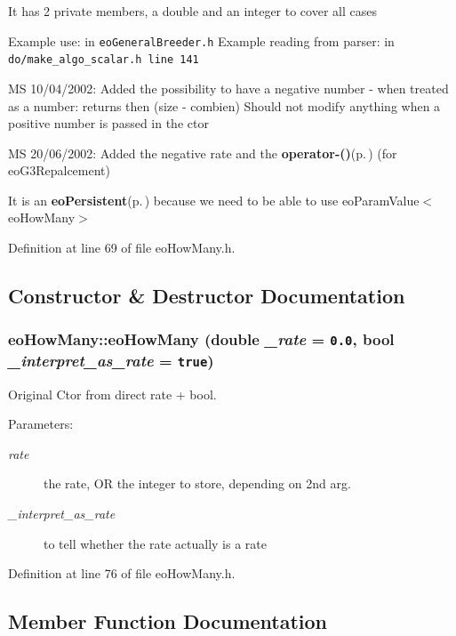 It has 2 private members, a double and an integer to cover all cases

Example use: in {\tt eo\-General\-Breeder.h} Example reading from parser: in {\tt do/make\_\-algo\_\-scalar.h line 141}

MS 10/04/2002: Added the possibility to have a negative number - when treated as a number: returns then (size - combien) Should not modify anything when a positive number is passed in the ctor

MS 20/06/2002: Added the negative rate and the {\bf operator-()}{\rm (p.\,\pageref{classeo_how_many_a8})} (for eo\-G3Repalcement)

It is an {\bf eo\-Persistent}{\rm (p.\,\pageref{classeo_persistent})} because we need to be able to use eo\-Param\-Value$<$eo\-How\-Many$>$ 



Definition at line 69 of file eo\-How\-Many.h.

\subsection{Constructor \& Destructor Documentation}
\subsubsection{\setlength{\rightskip}{0pt plus 5cm}eo\-How\-Many::eo\-How\-Many (double {\em \_\-rate} = {\tt 0.0}, bool {\em \_\-interpret\_\-as\_\-rate} = {\tt true})\hspace{0.3cm}{\tt  [inline]}}\label{classeo_how_many_a0}


Original Ctor from direct rate + bool. 

\begin{Desc}
\item[Parameters:]
\begin{description}
\item[{\em rate}]the rate, OR the integer to store, depending on 2nd arg. \item[{\em \_\-interpret\_\-as\_\-rate}]to tell whether the rate actually is a rate \end{description}
\end{Desc}


Definition at line 76 of file eo\-How\-Many.h.

\subsection{Member Function Documentation}
